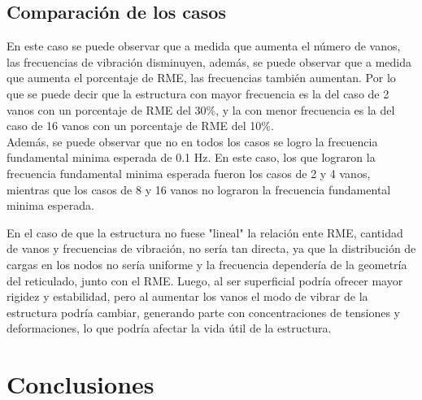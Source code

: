 \subsection{Comparación de los casos}

En este caso se puede observar que a medida que aumenta el número de vanos, las frecuencias de vibración disminuyen, además, se puede observar que a medida que aumenta el porcentaje de RME, las frecuencias también aumentan. Por lo que se puede decir que la estructura con mayor frecuencia es la del caso de 2 vanos con un porcentaje de RME del 30\%, y la con menor frecuencia es la del caso de 16 vanos con un porcentaje de RME del 10\%.\\
Además, se puede observar que no en todos los casos se logro la frecuencia fundamental minima esperada de 0.1 Hz. En este caso, los que lograron la frecuencia fundamental minima esperada fueron los casos de 2 y 4 vanos, mientras que los casos de 8 y 16 vanos no lograron la frecuencia fundamental minima esperada.

En el caso de que la estructura no fuese "lineal" la relación ente RME, cantidad de vanos y frecuencias de vibración, no sería tan directa, ya que la distribución de cargas en los nodos no sería uniforme y la frecuencia dependería de la geometría del reticulado, junto con el RME. Luego, al ser superficial podría ofrecer mayor rigidez y estabilidad, pero al aumentar los vanos el modo de vibrar de la estructura podría cambiar, generando parte con concentraciones de tensiones y deformaciones, lo que podría afectar la vida útil de la estructura.  

\section{Conclusiones}